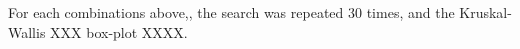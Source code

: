 For each combinations above,, the search was repeated 30 times, and the Kruskal-Wallis XXX box-plot XXXX.
%
%
%
%
%
%
%
%
%
%
%
%
%
%
%
%
%
%
%
